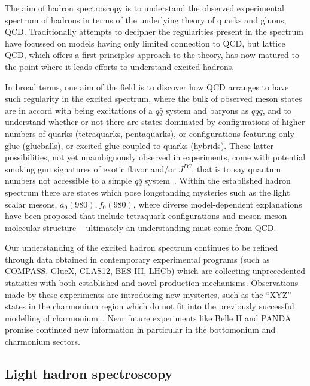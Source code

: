 

The aim of hadron spectroscopy is to understand the observed experimental spectrum of hadrons in terms of the underlying theory of quarks and gluons, QCD. Traditionally attempts to decipher the regularities present in the spectrum have focussed on models having only limited connection to QCD, but lattice QCD, which offers a first-principles approach to the theory, has now matured to the point where it leads efforts to understand excited hadrons.

In broad terms, one aim of the field is to discover how QCD arranges to have such regularity in the excited spectrum, where the bulk of observed meson states are in accord with being excitations of a $q\bar{q}$ system and baryons as $qqq$, and to understand whether or not there are states dominated by configurations of higher numbers of quarks (tetraquarks, pentaquarks), or configurations featuring only glue (glueballs), or excited glue coupled to quarks (hybrids). These latter possibilities, not yet unambiguously observed in experiments, come with potential smoking gun signatures of exotic flavor and/or $J^{PC}$, that is to say quantum numbers not accessible to a simple $q\bar{q}$ system~\cite{Meyer:2015eta}. Within the established hadron spectrum there are states which pose longstanding mysteries such as the light scalar mesons, $a_0(980), f_0(980)$, where diverse model-dependent explanations have been proposed that include tetraquark configurations and meson-meson molecular structure -- ultimately an understanding must come from QCD.

Our understanding of the excited hadron spectrum continues to be refined through data obtained in contemporary experimental programs (such as COMPASS, GlueX, CLAS12, BES III, LHCb) which are collecting unprecedented statistics with both established and novel production mechanisms. Observations made by these experiments are introducing new mysteries, such as the ``XYZ'' states in the charmonium region which do not fit into the previously successful modelling of charmonium~\cite{Lebed:2016hpi}. Near future experiments like Belle II and PANDA promise continued new information in particular in the bottomonium and charmonium sectors.


\subsection{Light hadron spectroscopy}

